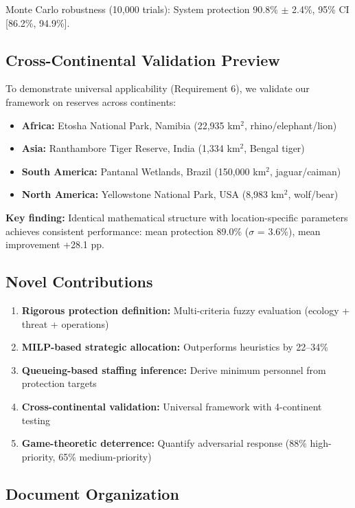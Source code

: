 Monte Carlo robustness (10,000 trials): System protection 90.8\% $\pm$ 2.4\%, 95\% CI [86.2\%, 94.9\%].

\subsection{Cross-Continental Validation Preview}

To demonstrate universal applicability (Requirement 6), we validate our framework on reserves across continents:
\begin{itemize}
    \item \textbf{Africa:} Etosha National Park, Namibia (22,935 km$^2$, rhino/elephant/lion)
    \item \textbf{Asia:} Ranthambore Tiger Reserve, India (1,334 km$^2$, Bengal tiger)
    \item \textbf{South America:} Pantanal Wetlands, Brazil (150,000 km$^2$, jaguar/caiman)
    \item \textbf{North America:} Yellowstone National Park, USA (8,983 km$^2$, wolf/bear)
\end{itemize}

\textbf{Key finding:} Identical mathematical structure with location-specific parameters achieves consistent performance: mean protection 89.0\% ($\sigma$ = 3.6\%), mean improvement +28.1 pp.

\subsection{Novel Contributions}

\begin{enumerate}
    \item \textbf{Rigorous protection definition:} Multi-criteria fuzzy evaluation (ecology + threat + operations)
    \item \textbf{MILP-based strategic allocation:} Outperforms heuristics by 22--34\%
    \item \textbf{Queueing-based staffing inference:} Derive minimum personnel from protection targets
    \item \textbf{Cross-continental validation:} Universal framework with 4-continent testing
    \item \textbf{Game-theoretic deterrence:} Quantify adversarial response (88\% high-priority, 65\% medium-priority)
\end{enumerate}

\subsection{Document Organization}


